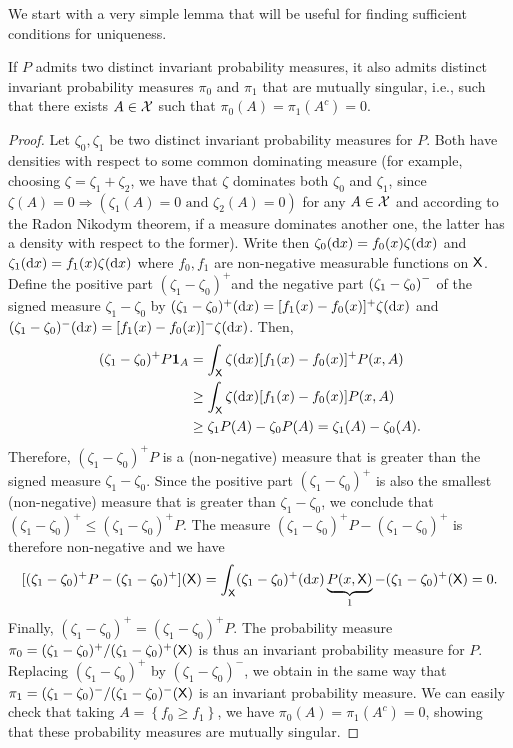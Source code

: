 \documentclass[english,graybox,envcountchap,envcountsame,sectrefs,shortlabels]{svmono}
\theoremstyle{style}
\newenvironment{svmultproof}{\small \begin{proof}}{\end{proof}}
\newcommand{\bfr}{\begin{framed}}
\newcommand{\efr}{\end{framed}}
\begin{document}
We start with a very simple lemma that will be useful for finding
sufficient conditions for uniqueness. \bfr
\begin{lemma}
\label{lem:invariant:singular} If $P$ admits two distinct invariant
probability measures, it also admits distinct invariant probability
measures $\pi_{0}$ and $\pi_{1}$ that are mutually singular, i.e.,
such that there exists $A\in\mathcal{X}$ such that $\pi_{0}(A)=\pi_{1}(A^{c})=0$.
\end{lemma}
\efr
\begin{svmultproof}
Let $\zeta_{0},\zeta_{1}$ be two distinct invariant probability measures
for $P$. Both have densities with respect to some common dominating
measure (for example, choosing $\zeta=\zeta_{1}+\zeta_{2}$, we have
that $\zeta$ dominates both $\zeta_{0}$ and $\zeta_{1}$, since $\zeta(A)=0\Rightarrow(\zeta_{1}(A)=0\mbox{ and }\zeta_{2}(A)=0)$
for any $A\in\mathcal{X}$ and according to the Radon Nikodym theorem,
if a measure dominates another one, the latter has a density with
respect to the former). Write then $\zeta_{0}(\mathrm{d} x)=f_{0}(x)\zeta(\mathrm{d} x)$
and $\zeta_{1}(\mathrm{d} x)=f_{1}(x)\zeta(\mathrm{d} x)$ where $f_{0},f_{1}$
are non-negative measurable functions on $\mathsf{X}$. Define the positive
part  $(\zeta_{1}-\zeta_{0})^{+}$and the negative part $\left(\zeta_{1}-\zeta_{0}\right)^{-}$
of the signed measure $\zeta_{1}-\zeta_{0}$ by $(\zeta_{1}-\zeta_{0})^{+}(\mathrm{d} x)=[f_{1}(x)-f_{0}(x)]^{+}\zeta(\mathrm{d} x)$
and $(\zeta_{1}-\zeta_{0})^{-}(\mathrm{d} x)=[f_{1}(x)-f_{0}(x)]^{-}\zeta(\mathrm{d} x)$.
Then,
\begin{align*}
(\zeta_{1}-\zeta_{0})^{+}P\mathbf{1}_{A} & =\int_{\mathsf{X}}\zeta(\mathrm{d} x)[f_{1}(x)-f_{0}(x)]^{+}P(x,A)\\
 & \geq\int_{\mathsf{X}}\zeta(\mathrm{d} x)[f_{1}(x)-f_{0}(x)]P(x,A)\\
 & \geq\zeta_{1}P(A)-\zeta_{0}P(A)=\zeta_{1}(A)-\zeta_{0}(A).
\end{align*}
Therefore, $(\zeta_{1}-\zeta_{0})^{+}P$ is a (non-negative) measure that
is greater than the signed measure $\zeta_{1}-\zeta_{0}$. Since the
positive part $(\zeta_{1}-\zeta_{0})^{+}$ is also the smallest (non-negative)
measure that is greater than $\zeta_{1}-\zeta_{0}$, we conclude that
$(\zeta_{1}-\zeta_{0})^{+}\leq(\zeta_{1}-\zeta_{0})^{+}P$. The measure
$(\zeta_{1}-\zeta_{0})^{+}P-(\zeta_{1}-\zeta_{0})^{+}$ is therefore
non-negative and we have
\[
[(\zeta_{1}-\zeta_{0})^{+}P-(\zeta_{1}-\zeta_{0})^{+}](\mathsf{X})=\int_{\mathsf{X}}(\zeta_{1}-\zeta_{0})^{+}(\mathrm{d} x)\underbrace{P(x,\mathsf{X})}_{1}-(\zeta_{1}-\zeta_{0})^{+}(\mathsf{X})=0.
\]
Finally, $(\zeta_{1}-\zeta_{0})^{+}=(\zeta_{1}-\zeta_{0})^{+}P$.
The probability measure $\pi_{0}=(\zeta_{1}-\zeta_{0})^{+}/(\zeta_{1}-\zeta_{0})^{+}(\mathsf{X})$
is thus an invariant probability measure for $P$. Replacing $(\zeta_{1}-\zeta_{0})^{+}$
by $(\zeta_{1}-\zeta_{0})^{-}$, we obtain in the same way that $\pi_{1}=(\zeta_{1}-\zeta_{0})^{-}/(\zeta_{1}-\zeta_{0})^{-}(\mathsf{X})$
is an invariant probability measure. We can easily check that taking
$A=\left\{ f_{0}\geq f_{1}\right\} $, we have $\pi_{0}(A)=\pi_{1}(A^{c})=0$,
showing that these probability measures are mutually singular.
\end{svmultproof}
\end{document}

